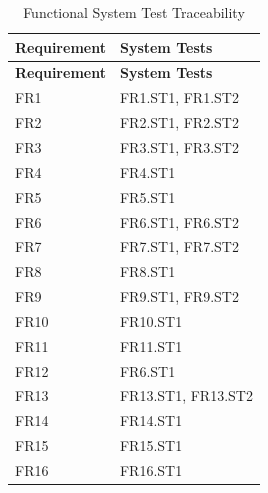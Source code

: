 \documentclass[12pt, titlepage]{article}
\begin{document}
\begin{longtable}[H]{|p{} | p{}|}
  \caption{Functional System Test Traceability}
  \label{TblFRSTTraceability}\\
  \hline
  \textbf{Requirement} & \textbf{System Tests}\\
  \hline
  \endfirsthead
  \hline
  \textbf{Requirement} & \textbf{System Tests}\\
  \hline
  \endhead
  FR1 & FR1.ST1, FR1.ST2\\
  \hline
  FR2 & FR2.ST1, FR2.ST2\\
  \hline
  FR3 & FR3.ST1, FR3.ST2\\
  \hline
  FR4 & FR4.ST1\\
  \hline
  FR5 & FR5.ST1\\
  \hline
  FR6 & FR6.ST1, FR6.ST2\\
  \hline
  FR7 & FR7.ST1, FR7.ST2\\
  \hline
  FR8 & FR8.ST1\\
  \hline
  FR9 & FR9.ST1, FR9.ST2\\
  \hline
  FR10 & FR10.ST1\\
  \hline
  FR11 & FR11.ST1\\
  \hline
  FR12 & FR6.ST1\\
  \hline
  FR13 & FR13.ST1, FR13.ST2\\
  \hline
  FR14 & FR14.ST1\\
  \hline
  FR15 & FR15.ST1\\
  \hline
  FR16 & FR16.ST1\\
  \hline
\end{longtable}
\end{document}
